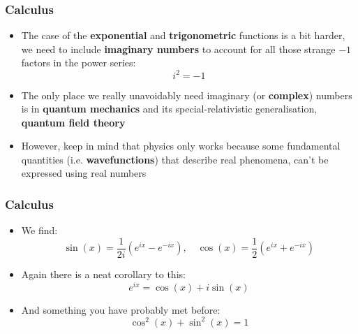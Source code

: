 \documentclass{beamer}
\begin{document}
\begin{frame}
  \frametitle{Calculus}
  \begin{itemize}
    \item<1-> The case of the \textbf{exponential} and \textbf{trigonometric} functions is a bit harder, we need to include \textbf{imaginary numbers} to account for all those strange $-1$ factors in the power series:
      \begin{equation*}
	i^2=-1
      \end{equation*}
    \item<2-> The only place we really unavoidably need imaginary (or \textbf{complex}) numbers is in \textbf{quantum mechanics} and its special-relativistic generalisation, \textbf{quantum field theory}
    \item<3-> However, keep in mind that physics only works because some fundamental quantities (i.e. \textbf{wavefunctions}) that describe real phenomena, can't be expressed using real numbers
  \end{itemize}
\end{frame}

\begin{frame}
  \frametitle{Calculus}
  \begin{itemize}
    \item<1-> We find:
      \begin{equation*}
	\sin(x)=\frac{1}{2i}\left( e^{ix}-e^{-ix} \right), \quad \cos(x)=\frac{1}{2}\left( e^{ix}+e^{-ix} \right)
      \end{equation*}
    \item<2-> Again there is a neat corollary to this:
      \begin{equation*}
	e^{ix}=\cos(x)+i\sin(x)
      \end{equation*}
    \item<3-> And something you have probably met before:
      \begin{equation*}
	\cos^2(x)+\sin^2(x)=1
      \end{equation*}
  \end{itemize}
\end{frame}
\end{document}
